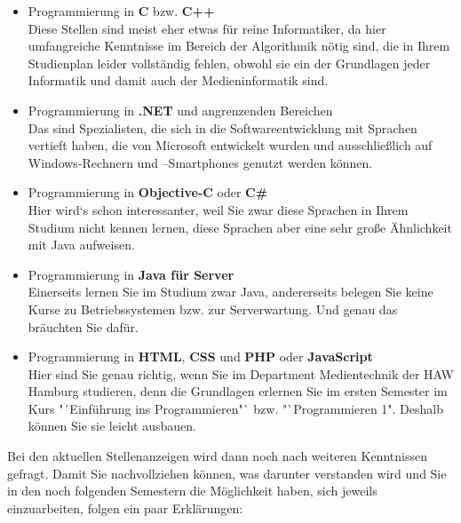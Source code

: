 \begin{itemize}
	\item Programmierung in \textbf{C} bzw. \textbf{C++}\\
	Diese Stellen sind meist eher etwas für reine Informatiker, da hier umfangreiche Kenntnisse im Bereich der Algorithmik nötig sind, die in Ihrem Studienplan leider vollständig fehlen, obwohl sie ein der Grundlagen jeder Informatik und damit auch der Medieninformatik sind.
	
	\item Programmierung in \textbf{.NET} und angrenzenden Bereichen\\
	Das sind Spezialisten, die sich in die Softwareentwicklung mit Sprachen vertieft haben, die von Microsoft entwickelt wurden und ausschließlich auf Windows-Rechnern und –Smartphones genutzt werden können.
	
	\item Programmierung in \textbf{Objective-C} oder \textbf{C\#}\\
	Hier wird‘s schon interessanter, weil Sie zwar diese Sprachen in Ihrem Studium nicht kennen lernen, diese Sprachen aber eine sehr große Ähnlichkeit mit Java aufweisen.
	
	\item Programmierung in \textbf{Java für Server}\\
	Einerseits lernen Sie im Studium zwar Java, andererseits belegen Sie keine Kurse zu Betriebssystemen bzw. zur Serverwartung. Und genau das bräuchten Sie dafür.
	
	\item Programmierung in \textbf{HTML}, \textbf{CSS} und \textbf{PHP} oder \textbf{JavaScript}\\
	Hier sind Sie genau richtig, wenn Sie im Department Medientechnik der HAW Hamburg studieren, denn die Grundlagen erlernen Sie im ersten Semester im Kurs "´Einführung ins Programmieren"` bzw. "`Programmieren 1". Deshalb können Sie sie leicht ausbauen.
\end{itemize}

Bei den aktuellen Stellenanzeigen wird dann noch nach weiteren Kenntnissen gefragt. Damit Sie nachvollziehen können, was darunter verstanden wird und Sie in den noch folgenden Semestern die Möglichkeit haben, sich jeweils einzuarbeiten, folgen ein paar Erklärungen:

